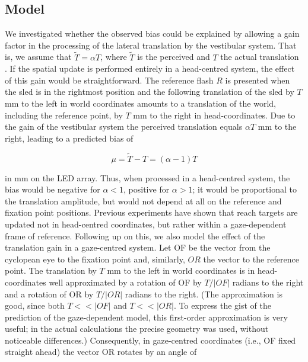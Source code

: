 \subsection{Model}
\label{p2:sec:model}

We investigated whether the observed bias could be explained by allowing a gain factor in the processing of the lateral translation by the vestibular system. That is, we assume that $\tilde{T} = {\alpha}T$, where $\tilde{T}$ is the perceived and $T$ the actual translation \cite{medendorp1999}. If the spatial update is performed entirely in a head-centred system, the effect of this gain would be straightforward. The reference flash $R$ is presented when the sled is in the rightmost position and the following translation of the sled by $T$ mm to the left in world coordinates amounts to a translation of the world, including the reference point, by $T$ mm to the right in head-coordinates. Due to the gain of the vestibular system the perceived translation equals ${\alpha}T$ mm to the right, leading to a predicted bias of

\begin{equation}
\label{p2:eq2}
\mu = \tilde{T} - T = (\alpha - 1) T
\end{equation}

in mm on the LED array. Thus, when processed in a head-centred system, the bias would be negative for $\alpha < 1$, positive for $\alpha > 1$; it would be proportional to the translation amplitude, but would not depend at all on the reference and fixation point positions.
Previous experiments \cite{vanpelt2007} have shown that reach targets are updated not in head-centred coordinates, but rather within a gaze-dependent frame of reference. Following up on this, we also model the effect of the translation gain in a gaze-centred system. Let OF be the vector from the cyclopean eye to the fixation point and, similarly, $OR$ the vector to the reference point. The translation by $T$ mm to the left in world coordinates is in head-coordinates well approximated by a rotation of OF by $T/|OF|$ radians to the right and a rotation of OR by $T/|OR|$ radians to the right. (The approximation is good, since both $T<<|OF|$ and $T<<|OR|$. To express the gist of the prediction of the gaze-dependent model, this first-order approximation is very useful; in the actual calculations the precise geometry was used, without noticeable differences.)  Consequently, in gaze-centred coordinates (i.e., OF fixed straight ahead) the vector OR rotates by an angle of


